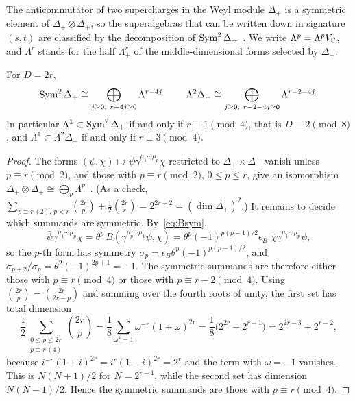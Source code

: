 The anticommutator of two supercharges in the Weyl module $\Delta_+$ is a symmetric element of $\Delta_+\otimes\Delta_+$, so the superalgebras that can be written down in signature $(s,t)$ are classified by the decomposition of $\operatorname{Sym}^2\Delta_+$~\cite{vanHoltenVanProeyen1982,DAuriaFerraraLledoVaradarajan2001}. We write $\Lambda^p=\Lambda^pV_{\mathbb{C}}$, and $\Lambda^r$ stands for the half $\Lambda^r_+$ of the middle-dimensional forms selected by $\Delta_+$.

\begin{proposition}
\label{prop:sym2}
For $D=2r$,
\begin{equation}
\label{eq:sym2}
\Sym^2\Delta_+\cong\bigoplus_{j\ge0,\ r-4j\ge0}\Lambda^{r-4j},\qquad \Lambda^2\Delta_+\cong\bigoplus_{j\ge0,\ r-2-4j\ge0}\Lambda^{r-2-4j}.
\end{equation}
In particular $\Lambda^1\subset\operatorname{Sym}^2\Delta_+$ if and only if $r\equiv1\pmod 4$, that is $D\equiv2\pmod 8$, and $\Lambda^1\subset\Lambda^2\Delta_+$ if and only if $r\equiv3\pmod 4$.
\end{proposition}

\begin{proof}
The forms $(\psi,\chi)\mapsto\bar\psi\gamma^{\mu_1\cdots\mu_p}\chi$ restricted to $\Delta_+\times\Delta_+$ vanish unless $p\equiv r\pmod 2$, and those with $p\equiv r\pmod 2$, $0\le p\le r$, give an isomorphism $\Delta_+\otimes\Delta_+\cong\bigoplus_{p}\Lambda^p$~\cite{Deligne1999,VanProeyen1999}. (As a check, $\sum_{p\equiv r\,(2),\,p<r}\binom{2r}{p}+\frac12\binom{2r}{r}=2^{2r-2}=(\dim\Delta_+)^2$.) It remains to decide which summands are symmetric. By~\eqref{eq:Bsym},
\[
\bar\psi\gamma^{\mu_1\cdots\mu_p}\chi=\theta^p\,B(\gamma^{\mu_p\cdots\mu_1}\psi,\chi)=\theta^p(-1)^{p(p-1)/2}\epsilon_B\;\bar\chi\gamma^{\mu_1\cdots\mu_p}\psi ,
\]
so the $p$-th form has symmetry $\sigma_p=\epsilon_B\theta^p(-1)^{p(p-1)/2}$, and $\sigma_{p+2}/\sigma_p=\theta^2(-1)^{2p+1}=-1$. The symmetric summands are therefore either those with $p\equiv r\pmod 4$ or those with $p\equiv r-2\pmod 4$. Using $\binom{2r}{p}=\binom{2r}{2r-p}$ and summing over the fourth roots of unity, the first set has total dimension
\[
\frac12\sum_{\substack{0\le p\le 2r\\ p\equiv r\,(4)}}\binom{2r}{p}=\frac18\sum_{\omega^4=1}\omega^{-r}(1+\omega)^{2r}=\frac18\bigl(2^{2r}+2^{r+1}\bigr)=2^{2r-3}+2^{r-2},
\]
because $i^{-r}(1+i)^{2r}=i^{r}(1-i)^{2r}=2^r$ and the term with $\omega=-1$ vanishes. This is $N(N+1)/2$ for $N=2^{r-1}$, while the second set has dimension $N(N-1)/2$. Hence the symmetric summands are those with $p\equiv r\pmod 4$.
\end{proof}

